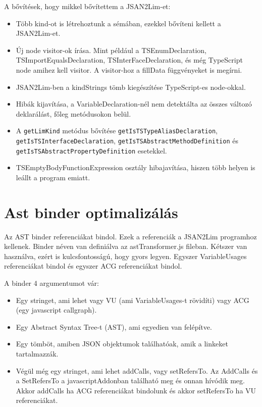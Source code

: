 A bővítések, hogy mikkel bővítettem a JSAN2Lim-et:
\begin{itemize}
      \item Több kind-ot is létrehoztunk a sémában, ezekkel bővíteni kellett a JSAN2Lim-et.
      \item Új node visitor-ok írása. Mint például a TSEnumDeclaration, TSImportEqualsDeclaration, TSInterFaceDeclaration, és még TypeScript node amihez kell visitor.
      A visitor-hoz a fillData függvényeket is megírni.
      \item JSAN2Lim-ben a kindStrings tömb kiegészítése TypeScript-es node-okkal.
      \item Hibák kijavítása, a VariableDeclaration-nél nem detektálta az összes változó deklarálást, főleg metódusokon belül.
      \item A \texttt{getLimKind} metódus bővítése \texttt{getIsTSTypeAliasDeclaration}, \texttt{getIsTSInterfaceDeclaration},
      \texttt{getIsTSAbstractMethodDefinition} és \texttt{getIsTSAbstractPropertyDefinition} esetekkel.
      \item TSEmptyBodyFunctionExpression osztály hibajavítása, hiszen több helyen is leállt a program emiatt.
\end{itemize}

\section{Ast binder optimalizálás}

Az AST binder referenciákat bindol. Ezek a referenciák a JSAN2Lim programhoz kellenek.
Binder néven van definiálva az astTransformer.js fileban.
Kétszer van használva, ezért is kulcsfontosságú, hogy gyors legyen.
Egyszer VariableUsages referenciákat bindol és egyszer ACG referenciákat bindol.

\noindent

A binder 4 argumentumot vár:

\begin{itemize}
      \item Egy stringet, ami lehet vagy VU (ami VariableUsages-t rövidíti) vagy ACG (egy javascript callgraph).
      \item Egy Abstract Syntax Tree-t (AST), ami egyedien van felépítve.
      \item Egy tömböt, amiben JSON objektumok találhatóak, amik a linkeket tartalmazzák.
      \item Végül még egy stringet, ami lehet addCalls, vagy setRefersTo. Az AddCalls és a SetRefersTo a javascriptAddonban található meg és onnan hívódik meg.
      Akkor addCalls ha ACG referenciákat bindolunk és akkor setRefersTo ha VU referenciákat.
\end{itemize}


